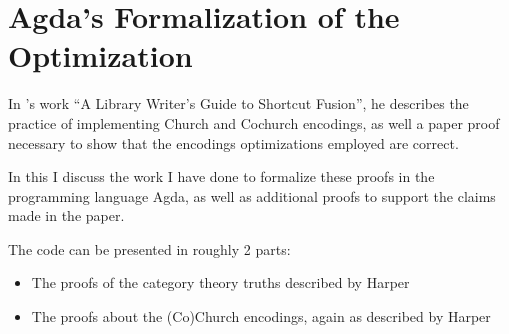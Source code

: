 \section{Agda's Formalization of the Optimization}\label{sec:formalization}
In \cite{Harper2011}'s work ``A Library Writer's Guide to Shortcut Fusion'', he describes the practice of implementing Church and Cochurch encodings, as well a paper proof necessary to show that the encodings optimizations employed are correct.

In this I discuss the work I have done to formalize these proofs in the programming language Agda, as well as additional proofs to support the claims made in the paper.

The code can be presented in roughly 2 parts:
\begin{itemize}
  \item The proofs of the category theory truths described by Harper
  \item The proofs about the (Co)Church encodings, again as described by Harper
\end{itemize}




